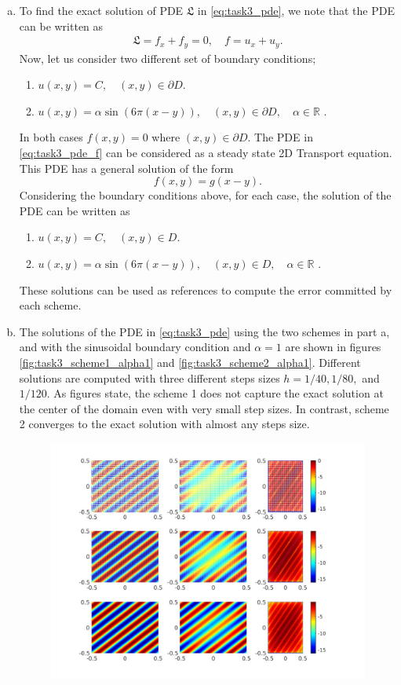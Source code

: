 \documentclass[10pt,a4paper,twoside, french]{article}
\numberwithin{equation}{section}
\numberwithin{figure}{section}
\numberwithin{table}{section}
\begin{document}
\begin{enumerate}
\begin{enumerate}[a.]
\item To find the exact solution of PDE $\mathfrak{L}$ in \eqref{eq:task3_pde}, we note that the PDE can be written as 
\begin{align}
\mathfrak{L} = f_x+f_y = 0, \quad f = u_x+u_y.
\label{eq:task3_pde_f}
\end{align}
Now, let us consider two different set of boundary conditions;
\begin{enumerate}
\item $u(x,y) = C, \quad (x,y)\in\partial D.$
\item $u(x,y) = \alpha \sin(6\pi(x-y)), \quad (x,y)\in\partial D, \quad \alpha\in\mathbb{R}$ .
\end{enumerate}
In both cases $f(x,y)=0$ where $(x,y)\in\partial D$. The PDE in \eqref{eq:task3_pde_f} can be considered as a steady state 2D Transport equation. This PDE has a general solution of the form
$$
f(x,y) = g(x-y).
$$
Considering the boundary conditions above, for each case, the solution of the PDE can be written as
\begin{enumerate}
\item $u(x,y) = C, \quad (x,y)\in D.$
\item $u(x,y) = \alpha \sin(6\pi(x-y)), \quad (x,y)\in D, \quad \alpha\in\mathbb{R}$ .
\end{enumerate}
These solutions can be used as references to compute the error committed by each scheme.
\item The solutions of the PDE in \eqref{eq:task3_pde} using the two schemes in part a, and with the sinusoidal boundary condition and $\alpha=1$ are shown in figures \ref{fig:task3_scheme1_alpha1} and \ref{fig:task3_scheme2_alpha1}. Different solutions are computed with three different steps sizes $h=1/40, 1/80,$ and $1/120$. As figures state, the scheme 1 does not capture the exact solution at the center of the domain even with very small step sizes. In contrast, scheme 2 converges to the exact solution with almost any steps size.
\begin{figure}[h]
\centering
\includegraphics[scale=.8]{fig/task3_scheme1_a1_N_40_80_120}

\end{figure}
\end{enumerate}
\end{enumerate}
\end{document}
